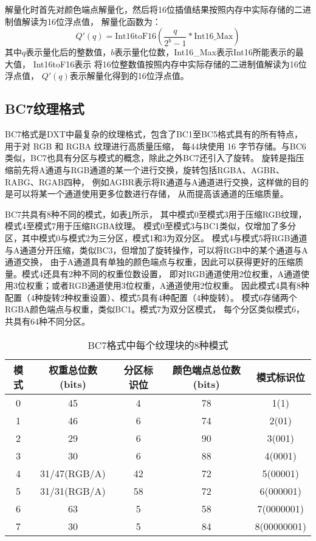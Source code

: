 解量化时首先对颜色端点解量化，然后将16位插值结果按照内存中实际存储的二进制值解读为16位浮点值，
解量化函数为：
\begin{equation}\label{eqn-6}
    Q'(q)=\text{Int16toF16}(\frac{q}{2^{b}-1}*\text{Int16\_Max})
\end{equation}
其中$q$表示量化后的整数值，$b$表示量化位数，Int16\_Max表示Int16所能表示的最大值，
Int16toF16表示
将16位整数值按照内存中实际存储的二进制值解读为16位浮点值，
$Q'(q)$表示解量化得到的16位浮点值。



\subsection{BC7纹理格式}

BC7格式是DXT中最复杂的纹理格式，包含了BC1至BC5格式具有的所有特点，
用于对 RGB 和 RGBA 纹理进行高质量压缩，
每4\times4块使用 16 字节存储。与BC6类似，BC7也具有分区与模式的概念，除此之外BC7还引入了旋转。
旋转是指压缩前先将A通道与RGB通道的某一个进行交换，旋转包括RGBA、AGBR、RABG、RGAB四种，
例如AGBR表示将R通道与A通道进行交换，这样做的目的是可以将某一个通道使用更多位数进行存储，
从而提高该通道的压缩质量。

BC7共具有8种不同的模式，如表\ref{tab:BC7Mode}所示，
其中模式0至模式3用于压缩RGB纹理，模式4至模式7用于压缩RGBA纹理。
模式0至模式3与BC1类似，仅增加了多分区，其中模式0与模式2为三分区，模式1和3为双分区。
模式4与模式5将RGB通道与A通道分开压缩，类似BC3，但增加了旋转操作，可以将RGB中的某个通道与A通道交换，
由于A通道具有单独的颜色端点与权重，因此可以获得更好的压缩质量。模式4还具有2种不同的权重位数设置，
即对RGB通道使用2位权重，A通道使用3位权重；或者RGB通道使用3位权重，A通道使用2位权重。
因此模式4具有8种配置（4种旋转\times2种权重设置）、模式5具有4种配置（4种旋转）。
模式6存储两个RGBA颜色端点与权重，类似BC1。模式7为双分区模式，
每个分区类似模式6，共具有64种不同分区。

\begin{table}[htbp]
    \centering
    \caption{BC7格式中每个纹理块的8种模式\cite{BC7}}
    \label{tab:BC7Mode}        
    \begin{tabular}{ccccc}
    \toprule
    模式 & 权重总位数(bits) & 分区标识位 & 颜色端点总位数(bits) & 模式标识位\\
    \midrule
    0   &   45    &  4  &   78  &   1(1)   \\
    1   &   46    &  6  &   74  &   2(01)   \\
    2   &   29    &  6  &   90  &   3(001)   \\
    3   &   30    &  6  &   88  &   4(0001)   \\
    4   &   31/47(RGB/A)    &  42  &   72  &   5(00001)   \\
    5   &   31/31(RGB/A)    &  58  &   72  &   6(000001)   \\
    6   &   63    &  5  &   58  &   7(0000001)   \\
    7   &   30    &  5  &   84  &   8(00000001)   \\
    \bottomrule
    \end{tabular}
\end{table}

